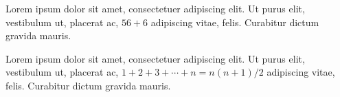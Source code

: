 \documentclass[a4paper,12pt]{article}
\begin{document}

Lorem ipsum dolor sit amet, consectetuer adipiscing elit. Ut purus elit, vestibulum ut, placerat ac, $ 56+6 $ adipiscing vitae, felis. Curabitur dictum gravida mauris. 

Lorem ipsum dolor sit amet, consectetuer adipiscing elit. Ut purus elit, vestibulum ut, placerat ac, $ 1+2+3+ \cdots + n = n(n+1)/2  $ adipiscing vitae, felis. Curabitur dictum gravida mauris.



% 
% 
% 
% 



% 
\end{document}
